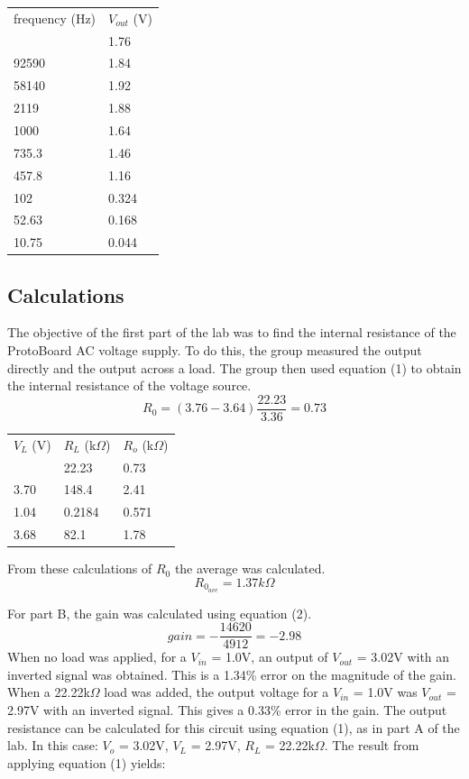 \documentclass[twocolumn, amsmath]{revtex4}
\begin{document}
\begin{center}
	\begin{ruledtabular}
    \begin{tabular}{ l l }
	frequency (Hz) & $V_{out}$ (V) \\ \colrule
	102000 & 1.76 \\
	92590 & 1.84  \\
	58140 & 1.92 \\
	2119 & 1.88 \\
	1000 & 1.64 \\
	735.3 & 1.46 \\
	457.8 & 1.16 \\
	102 & 0.324 \\
	52.63 & 0.168 \\
	10.75 & 0.044 \\
\end{tabular}
    \end{ruledtabular}
\end{center}


\subsection{Calculations}

The objective of the first part of the lab was to find the internal resistance of the ProtoBoard AC voltage supply. To do this, the group measured the output directly and the output across a load. The group then used equation (1) to obtain the internal resistance of the voltage source.
$$R_{0} = (3.76 - 3.64)\frac{22.23}{3.36}=0.73$$


\begin{center}
	\begin{ruledtabular}
    \begin{tabular}{ l l l }
	$V_{L}$ (V) & $R_{L}$ (k$\Omega$) & $R_{o}$ (k$\Omega$) \\ \colrule
	3.64 & 22.23 & 0.73 \\
	3.70 & 148.4 & 2.41 \\
	1.04 & 0.2184 & 0.571 \\
	3.68 & 82.1 & 1.78 \\
\end{tabular}
    \end{ruledtabular}
\end{center}

From these calculations of $R_{0}$ the average was calculated. 
$$R_{0_{ave}} = 1.37k\Omega$$

For part B, the gain was calculated using equation (2). 
$$gain = -\frac{14620}{4912} = -2.98$$
When no load was applied, for a $V_{in}$ = 1.0V, an output of $V_{out}$ = 3.02V with an inverted signal was obtained. This is a 1.34\% error on the magnitude of the gain. When a 22.22k$\Omega$ load was added, the output voltage for a $V_{in}$ = 1.0V was $V_{out}$ = 2.97V with an inverted signal. This gives a 0.33\% error in the gain. The output resistance can be calculated for this circuit using equation (1), as in part A of the lab. In this case: $V_{o}$ = 3.02V, $V_{L}$ = 2.97V, $R_{L}$ = 22.22k$\Omega$. The result from applying equation (1) yields: 
\end{document}
